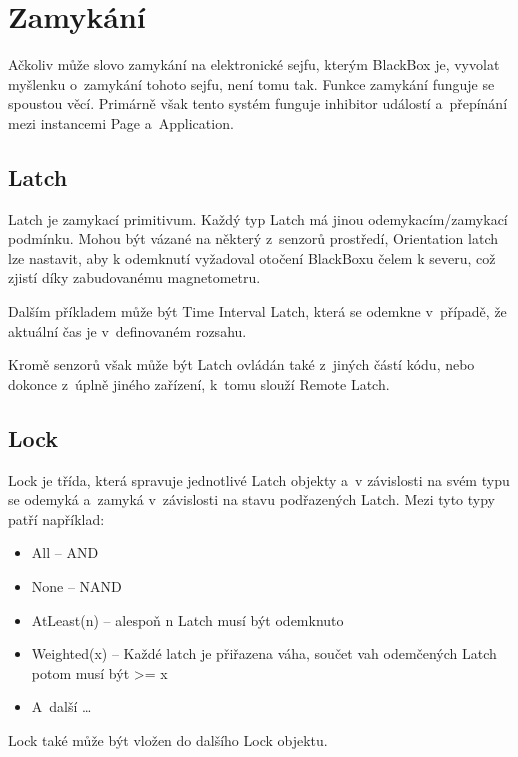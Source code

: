 \section{Zamykání}

Ačkoliv může slovo zamykání na elektronické sejfu, kterým BlackBox je, vyvolat myšlenku o~zamykání tohoto sejfu, není tomu tak.
Funkce zamykání funguje se spoustou věcí.
Primárně však tento systém funguje inhibitor událostí a~přepínání mezi instancemi Page a~Application.

\subsection{Latch}
Latch je zamykací primitivum.
Každý typ Latch má jinou odemykacím/zamykací podmínku.
Mohou být vázané na některý z~senzorů prostředí, Orientation latch lze nastavit, aby k odemknutí vyžadoval otočení BlackBoxu čelem k severu, což zjistí díky zabudovanému magnetometru.

Dalším příkladem může být Time Interval Latch, která se odemkne v~případě, že aktuální čas je v~definovaném rozsahu.

Kromě senzorů však může být Latch ovládán také z~jiných částí kódu, nebo dokonce z~úplně jiného zařízení, k~tomu slouží Remote Latch.

\subsection{Lock}

Lock je třída, která spravuje jednotlivé Latch objekty a~v závislosti na svém typu se odemyká a~zamyká v~závislosti na stavu podřazených Latch.
Mezi tyto typy patří například:
\begin{itemize}
    \item All -- AND
    \item None -- NAND
    \item AtLeast(n) -- alespoň n Latch musí být odemknuto
    \item Weighted(x) -- Každé latch je přiřazena váha, součet vah odemčených Latch potom musí být >= x
    \item A~další \dots
\end{itemize}
Lock také může být vložen do dalšího Lock objektu.

